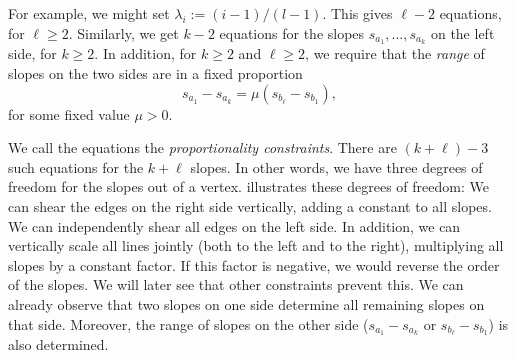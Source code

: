 \documentclass{patmorin}
\begin{document}
For example, we might set $\lambda_i := (i-1)/(l-1)$.
This gives $\ell-2$ equations, for $\ell\ge 2$. Similarly, we get
$k-2$ equations for the slopes
$s_{a_1}, \dots, s_{a_{k}}$ on the left side, for $k\ge 2$.
In addition, for $k\ge 2$ and $\ell\ge 2$, we require that the \emph{range} of
slopes
on the two sides are in a fixed proportion
\begin{equation}
  \label{eq:proportion2}
s_{a_1}-s_{a_{k}} = \mu (s_{b_{\ell}}-s_{b_1}),
\end{equation}
for some fixed value $\mu>0$.

We call the equations
\thetag{\ref{eq:proportion}--\ref{eq:proportion2}} the
\emph{proportionality constraints}.
There are $(k+\ell)-3$ such equations for the $k+\ell$ slopes. In
other words, we have three degrees of freedom for the slopes out of a vertex.
 illustrates these  degrees of freedom:
We can shear the edges on the right side vertically, adding a constant to all
slopes.
 We can independently shear all edges on the left side.
In addition, we can vertically scale {all} lines jointly (both to
the left and to the right), multiplying all slopes by a constant factor.
If this factor is negative, we would reverse the order of the
slopes. We will later see that other constraints prevent this.
We can already observe that two slopes on one side determine all
remaining slopes on that side. Moreover, the range of slopes
on the other side
($s_{a_1}-s_{a_{k}}$ or $s_{b_{\ell}}-s_{b_1}$) is also determined.
\end{document}
